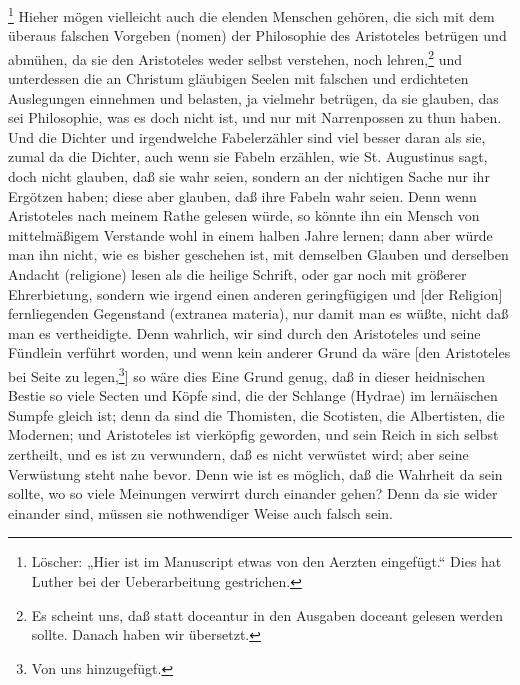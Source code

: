 \footnote{Löscher: „Hier ist im Manuscript etwas von den Aerzten eingefügt.“ Dies hat Luther bei der Ueberarbeitung gestrichen.} Hieher mögen vielleicht auch die elenden Menschen gehören, die sich mit dem überaus falschen Vorgeben (nomen) der Philosophie des Aristoteles betrügen und abmühen, da sie den Aristoteles weder selbst verstehen, noch lehren,\footnote{Es scheint uns, daß statt doceantur in den Ausgaben doceant gelesen werden sollte. Danach haben wir übersetzt.} und unterdessen die an Christum gläubigen Seelen mit falschen und erdichteten Auslegungen einnehmen und belasten, ja vielmehr betrügen, da sie glauben, das sei Philosophie, was es doch nicht ist, und nur mit Narrenpossen zu thun haben. Und die Dichter und irgendwelche Fabelerzähler sind viel besser daran als sie, zumal da die Dichter, auch wenn sie Fabeln erzählen, wie St. Augustinus sagt, doch nicht glauben, daß sie wahr seien, sondern an der nichtigen Sache nur ihr Ergötzen haben; diese aber glauben, daß ihre Fabeln wahr seien. Denn wenn Aristoteles nach meinem Rathe gelesen würde, so könnte ihn ein Mensch von mittelmäßigem Verstande wohl in einem halben Jahre lernen; dann aber würde man ihn nicht, wie es bisher geschehen ist, mit demselben Glauben und derselben Andacht (religione) lesen als die heilige Schrift, oder gar noch mit größerer Ehrerbietung, sondern wie irgend einen anderen geringfügigen und [der Religion] fernliegenden Gegenstand (extranea materia), nur damit man es wüßte, nicht daß man es vertheidigte. Denn wahrlich, wir sind durch den Aristoteles und seine Fündlein verführt worden, und wenn kein anderer Grund da wäre [den Aristoteles bei Seite zu legen,\footnote{Von uns hinzugefügt.}] so wäre dies Eine Grund genug, daß in dieser heidnischen Bestie so viele Secten und Köpfe sind, die der Schlange (Hydrae) im lernäischen Sumpfe gleich ist; denn da sind die Thomisten, die Scotisten, die Albertisten, die Modernen; und Aristoteles ist vierköpfig geworden, und sein Reich in sich selbst zertheilt, und es ist zu verwundern, daß es nicht verwüstet wird; aber seine Verwüstung steht nahe bevor. Denn wie ist es möglich, daß die Wahrheit da sein sollte, wo so viele Meinungen verwirrt durch einander gehen? Denn da sie wider einander sind, müssen sie nothwendiger Weise auch falsch sein.


